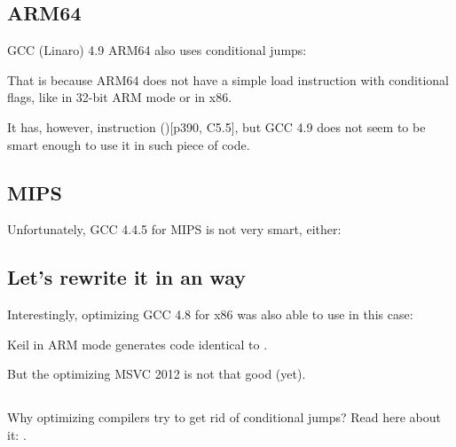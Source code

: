 

\subsection{ARM64}

\Optimizing GCC (Linaro) 4.9 \ForENRU ARM64 also uses conditional jumps:



That is because ARM64 does not have a simple load instruction with conditional flags,
like  in 32-bit ARM mode or  in x86.

It has, however,  instruction ()[\ARMSixFourRef p390, C5.5],
but GCC 4.9 does not seem to be smart enough to use it in such piece of code.

\subsection{MIPS}

Unfortunately, GCC 4.4.5 for MIPS is not very smart, either:



\subsection{Let's rewrite it in an  way}




Interestingly, optimizing GCC 4.8 for x86 was also able to use  in this case:



\Optimizing Keil in ARM mode generates code identical to .

But the optimizing MSVC 2012 is not that good (yet).

\subsection{\Conclusion{}}

Why optimizing compilers try to get rid of conditional jumps? Read here about it: .
